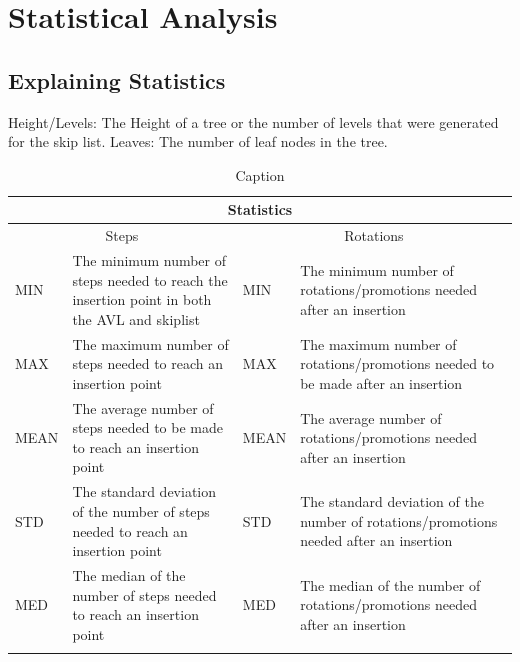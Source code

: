 \documentclass[12pt, a4paper]{report}
\begin{document}
\chapter{Statistical Analysis}
\section{Explaining Statistics}
Height/Levels: The Height of a tree or the number of levels that were generated for the skip list.
Leaves: The number of leaf nodes in the tree.
\begin{table}[!htp]
    \centering 
    \begin{tabular}{|p{2cm}|p{5.5cm}||p{2cm}|p{5.5cm}|}
    \hline\multicolumn{4}{|c|}{Statistics}
    \\\hline
    \multicolumn{2}{|c||}{Steps} & \multicolumn{2}{|c|}{Rotations}
         \\\hline
         MIN& The minimum number of steps needed to reach the insertion point in both the AVL and skiplist&
         MIN& The minimum number of rotations/promotions needed after an insertion
         \\\hline
         MAX& The maximum number of steps needed to reach an insertion point&
         MAX& The maximum number of rotations/promotions needed to be made after an insertion
         \\\hline
         MEAN& The average number of steps needed to be made to reach an insertion point&
         MEAN& The average number of rotations/promotions needed after an insertion
         \\\hline
         STD& The standard deviation of the number of steps needed to reach an insertion point&
         STD& The standard deviation of the number of rotations/promotions needed after an insertion
         \\\hline
         MED& The median of the number of steps needed to reach an insertion point&
         MED& The median of the number of rotations/promotions needed after an insertion
         \\\hline
     \\\hline
    \end{tabular}
    \caption{Caption}
    \label{tab:my_label}
\end{table}
\end{document}
